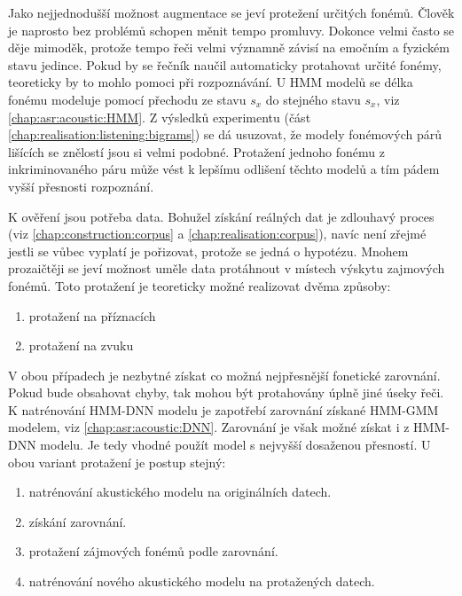 Jako nejjednodušší možnost augmentace se jeví protežení určitých fonémů. Člověk je naprosto bez problémů schopen měnit tempo promluvy. Dokonce velmi často se děje mimoděk, protože tempo řeči velmi významně závisí na emočním a fyzickém stavu jedince. Pokud by se řečník naučil automaticky protahovat určité fonémy, teoreticky by to mohlo pomoci při rozpoznávání. U HMM modelů se délka fonému modeluje pomocí přechodu ze stavu $s_x$ do stejného stavu $s_x$, viz \ref{chap:asr:acoustic:HMM}. Z výsledků  experimentu (část \ref{chap:realisation:listening:bigrams}) se dá usuzovat, že modely fonémových párů lišících se znělostí jsou si velmi podobné. Protažení jednoho fonému z inkriminovaného páru může vést k lepšímu odlišení těchto modelů
a tím pádem vyšší přesnosti rozpoznání.

K ověření jsou potřeba data. Bohužel získání reálných dat je zdlouhavý proces (viz \ref{chap:construction:corpus} a \ref{chap:realisation:corpus}), navíc není zřejmé jestli se vůbec vyplatí je pořizovat, protože se jedná o hypotézu. Mnohem prozaičtěji se jeví možnost uměle data protáhnout v místech výskytu zajmových fonémů. Toto protažení je teoreticky možné realizovat dvěma způsoby:

\begin{enumerate}
  \item protažení na příznacích
  \item protažení na zvuku
\end{enumerate}

\noindent V obou případech je nezbytné získat co možná nejpřesnější fonetické zarovnání. Pokud bude obsahovat chyby, tak mohou být protahovány úplně jiné úseky řeči. K natrénování HMM-DNN modelu je zapotřebí zarovnání získané HMM-GMM modelem, viz \ref{chap:asr:acoustic:DNN}. Zarovnání je však možné získat i z HMM-DNN modelu. Je tedy vhodné použít model s nejvyšší dosaženou přesností. U obou variant protažení je postup stejný:

\begin{enumerate}
  \item natrénování akustického modelu na originálních datech.
  \item získání zarovnání.
  \item protažení zájmových fonémů podle zarovnání.
  \item natrénování nového akustického modelu na protažených datech.
\end{enumerate}

